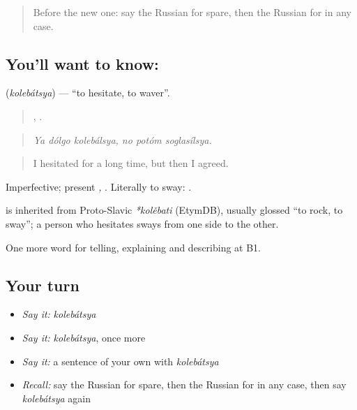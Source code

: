 \label{lesson:RU-C379-kolebatsya}



\begin{quote}
Before the new one: say the Russian for spare, then the Russian for in any case.
\end{quote}

\subsection*{You'll want to know: }
\textbf{} (\emph{kolebátsya}) — \textquotedblleft{}to hesitate, to waver\textquotedblright{}.

\begin{quote}
  ,   .
\end{quote}

\begin{quote}
\emph{Ya dólgo kolebálsya, no potóm soglasílsya.}
\end{quote}

\begin{quote}
I hesitated for a long time, but then I agreed.
\end{quote}

Imperfective; present \emph{, }. Literally to sway: \emph{ }.

\begin{cousinweb}
\textbf{} is inherited from Proto-Slavic \emph{*kolěbati} (EtymDB), usually glossed \textquotedblleft{}to rock, to sway\textquotedblright{}; a person who hesitates sways from one side to the other.
\end{cousinweb}

\begin{grammarlens}[title={What you've built}]
One more word for telling, explaining and describing at B1.
\end{grammarlens}

\subsection*{Your turn}
\begin{itemize}
\raggedright
  \item \emph{Say it:} \emph{kolebátsya}
  \item \emph{Say it:} \emph{kolebátsya}, once more
  \item \emph{Say it:} a sentence of your own with \emph{kolebátsya}
  \item \emph{Recall:} say the Russian for spare, then the Russian for in any case, then say \emph{kolebátsya} again
\end{itemize}

